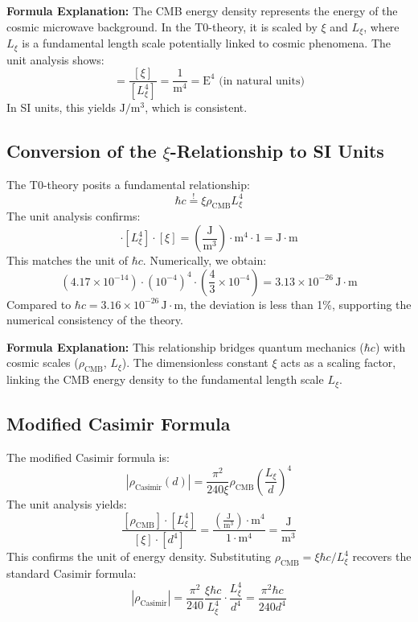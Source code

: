 \documentclass{article}
\begin{document}
	\textbf{Formula Explanation:} The CMB energy density represents the energy of the cosmic microwave background. In the T0-theory, it is scaled by $\xi$ and $L_\xi$, where $L_\xi$ is a fundamental length scale potentially linked to cosmic phenomena. The unit analysis shows:
	\begin{equation}
		[\rho_{\text{CMB}}] = \frac{[\xi]}{[L_\xi^4]} = \frac{1}{\text{m}^4} = \text{E}^4 \text{ (in natural units)}
	\end{equation}
	In SI units, this yields $\text{J}/\text{m}^3$, which is consistent.
	
	\subsection{Conversion of the $\xi$-Relationship to SI Units}
	The T0-theory posits a fundamental relationship:
	\begin{equation}
		\hbar c \stackrel{!}{=} \xi \rho_{\text{CMB}} L_\xi^4
	\end{equation}
	The unit analysis confirms:
	\begin{equation}
		[\rho_{\text{CMB}}] \cdot [L_\xi^4] \cdot [\xi] = \left( \frac{\text{J}}{\text{m}^3} \right) \cdot \text{m}^4 \cdot 1 = \text{J} \cdot \text{m}
	\end{equation}
	This matches the unit of $\hbar c$. Numerically, we obtain:
	\begin{equation}
		\left( 4.17 \times 10^{-14} \right) \cdot \left( 10^{-4} \right)^4 \cdot \left( \frac{4}{3} \times 10^{-4} \right) = 3.13 \times 10^{-26} \, \text{J} \cdot \text{m}
	\end{equation}
	Compared to $\hbar c = 3.16 \times 10^{-26} \, \text{J} \cdot \text{m}$, the deviation is less than 1\%, supporting the numerical consistency of the theory.
	
	\textbf{Formula Explanation:} This relationship bridges quantum mechanics ($\hbar c$) with cosmic scales ($\rho_{\text{CMB}}$, $L_\xi$). The dimensionless constant $\xi$ acts as a scaling factor, linking the CMB energy density to the fundamental length scale $L_\xi$.
	
	\subsection{Modified Casimir Formula}
	The modified Casimir formula is:
	\begin{equation}
		|\rho_{\text{Casimir}}(d)| = \frac{\pi^2}{240 \xi} \rho_{\text{CMB}} \left( \frac{L_\xi}{d} \right)^4
	\end{equation}
	The unit analysis yields:
	\begin{equation}
		\frac{[\rho_{\text{CMB}}] \cdot [L_\xi^4]}{[\xi] \cdot [d^4]} = \frac{\left( \frac{\text{J}}{\text{m}^3} \right) \cdot \text{m}^4}{1 \cdot \text{m}^4} = \frac{\text{J}}{\text{m}^3}
	\end{equation}
	This confirms the unit of energy density. Substituting $\rho_{\text{CMB}} = \xi \hbar c / L_\xi^4$ recovers the standard Casimir formula:
	\begin{equation}
		|\rho_{\text{Casimir}}| = \frac{\pi^2}{240} \frac{\xi \hbar c}{L_\xi^4} \cdot \frac{L_\xi^4}{d^4} = \frac{\pi^2 \hbar c}{240 d^4}
	\end{equation}
	
\end{document}
